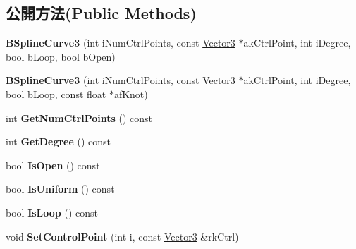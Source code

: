 \subsection*{公開方法(Public Methods)}
\begin{DoxyCompactItemize}
\item 
{\bfseries B\+Spline\+Curve3} (int i\+Num\+Ctrl\+Points, const \hyperlink{class_magnum_1_1_vector3}{Vector3} $\ast$ak\+Ctrl\+Point, int i\+Degree, bool b\+Loop, bool b\+Open)\hypertarget{class_magnum_1_1_b_spline_curve3_a59b332e5e3fb99424b38526849bb3dba}{}\label{class_magnum_1_1_b_spline_curve3_a59b332e5e3fb99424b38526849bb3dba}

\item 
{\bfseries B\+Spline\+Curve3} (int i\+Num\+Ctrl\+Points, const \hyperlink{class_magnum_1_1_vector3}{Vector3} $\ast$ak\+Ctrl\+Point, int i\+Degree, bool b\+Loop, const float $\ast$af\+Knot)\hypertarget{class_magnum_1_1_b_spline_curve3_a8decaf0c70273f581556a49b00b747c7}{}\label{class_magnum_1_1_b_spline_curve3_a8decaf0c70273f581556a49b00b747c7}

\item 
int {\bfseries Get\+Num\+Ctrl\+Points} () const \hypertarget{class_magnum_1_1_b_spline_curve3_a1f129fe4028a03b1e88d44664ba5efa3}{}\label{class_magnum_1_1_b_spline_curve3_a1f129fe4028a03b1e88d44664ba5efa3}

\item 
int {\bfseries Get\+Degree} () const \hypertarget{class_magnum_1_1_b_spline_curve3_aa2a899f144aa6ecbc117b10a2080239b}{}\label{class_magnum_1_1_b_spline_curve3_aa2a899f144aa6ecbc117b10a2080239b}

\item 
bool {\bfseries Is\+Open} () const \hypertarget{class_magnum_1_1_b_spline_curve3_aa2888cc16f31ab618dc921143f10542c}{}\label{class_magnum_1_1_b_spline_curve3_aa2888cc16f31ab618dc921143f10542c}

\item 
bool {\bfseries Is\+Uniform} () const \hypertarget{class_magnum_1_1_b_spline_curve3_a24ba1ff081643f0d905436053fb494cf}{}\label{class_magnum_1_1_b_spline_curve3_a24ba1ff081643f0d905436053fb494cf}

\item 
bool {\bfseries Is\+Loop} () const \hypertarget{class_magnum_1_1_b_spline_curve3_abaa7965d69cc77282f45787b94c5e1d5}{}\label{class_magnum_1_1_b_spline_curve3_abaa7965d69cc77282f45787b94c5e1d5}

\item 
void {\bfseries Set\+Control\+Point} (int i, const \hyperlink{class_magnum_1_1_vector3}{Vector3} \&rk\+Ctrl)\hypertarget{class_magnum_1_1_b_spline_curve3_abb6687826ac7f1886624e8dbb63ed9ea}{}\label{class_magnum_1_1_b_spline_curve3_abb6687826ac7f1886624e8dbb63ed9ea}


\end{DoxyCompactItemize}

